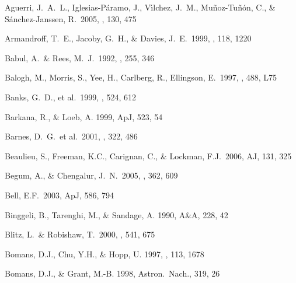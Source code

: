 \documentclass[12pt,preprint]{emulateapj}
\begin{document}


\begin{thebibliography}{}

Aguerri, J.~A.~L., Iglesias-P{\'a}ramo, J., V{\'{\i}}lchez, J.~M., 
Mu{\~n}oz-Tu{\~n}{\'o}n, C., \& S{\'a}nchez-Janssen, R.\ 2005, \aj, 130, 475 

Armandroff, T.~E., Jacoby, G.~H., \& Davies, J.~E.\ 1999, \aj, 118, 1220

Babul, A.~\& Rees, M.~J.\ 1992, \mnras, 255, 346 

Balogh, M., Morris, S., Yee, H., Carlberg, R., Ellingson, E.\ 1997, \apj, 488, L75 

Banks, G.~D., et al.\ 1999, \apj, 524, 612 

Barkana, R., \& Loeb, A. 1999, ApJ, 523, 54

Barnes, D.~G.~et al.\ 2001, \mnras, 322, 486 

Beaulieu, S., Freeman, K.C., Carignan, C., \&  Lockman, F.J.\ 2006, AJ, 131, 325 

Begum, A., \& Chengalur, J.~N.\ 2005, \mnras, 362, 609 

Bell, E.F.\ 2003, ApJ, 586, 794

Binggeli, B., Tarenghi, M., \& Sandage, A. 1990, A\&A, 228, 42

Blitz, L.~\& Robishaw, T.\ 2000, \apj, 541, 675 

Bomans, D.J., Chu, Y.H., \& Hopp, U. 1997, \aj , 113, 1678

Bomans, D.J., \& Grant, M.-B. 1998, Astron.\ Nach., 319, 26


\end{thebibliography}
\end{document}
